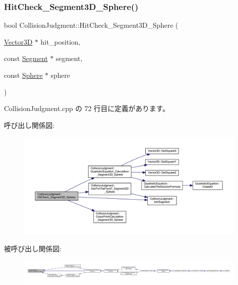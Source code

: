 \subsubsection{\texorpdfstring{Hit\+Check\+\_\+\+Segment3\+D\+\_\+\+Sphere()}{HitCheck\_Segment3D\_Sphere()}}
{\footnotesize\ttfamily bool Collision\+Judgment\+::\+Hit\+Check\+\_\+\+Segment3\+D\+\_\+\+Sphere (\begin{DoxyParamCaption}\item[{\mbox{\hyperlink{class_vector3_d}{Vector3D}} $\ast$}]{hit\+\_\+position,  }\item[{const \mbox{\hyperlink{class_segment}{Segment}} $\ast$}]{segment,  }\item[{const \mbox{\hyperlink{class_sphere}{Sphere}} $\ast$}]{sphere }\end{DoxyParamCaption})\hspace{0.3cm}{\ttfamily [static]}}



 Collision\+Judgment.\+cpp の 72 行目に定義があります。

呼び出し関係図\+:\nopagebreak
\begin{figure}[H]
\begin{center}
\leavevmode
\includegraphics[width=350pt]{class_collision_judgment_a92531c1254846a0a06ee7e95796f1070_cgraph}
\end{center}
\end{figure}
被呼び出し関係図\+:
\nopagebreak
\begin{figure}[H]
\begin{center}
\leavevmode
\includegraphics[width=350pt]{class_collision_judgment_a92531c1254846a0a06ee7e95796f1070_icgraph}
\end{center}
\end{figure}
\mbox{\label{class_collision_judgment_a4f5344d6ac14db5d3732db47050bd549}} 
